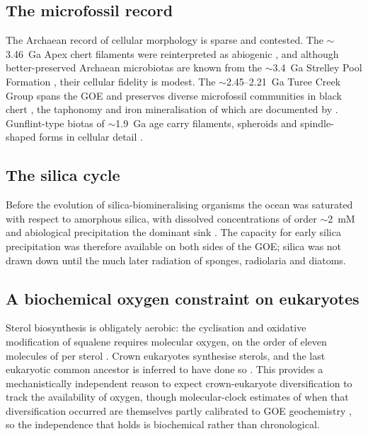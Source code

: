 \documentclass[11pt]{article}
\begin{document}
\subsection{The microfossil record}

The Archaean record of cellular morphology is sparse and contested. The $\sim$3.46~Ga Apex chert
filaments \citep{Schopf1993} were reinterpreted as abiogenic \citep{Brasier2002}, and although
better-preserved Archaean microbiotas are known from the $\sim$3.4~Ga Strelley Pool Formation
\citep{Sugitani2010,Delarue2020}, their cellular fidelity is modest. The $\sim$2.45--2.21~Ga Turee
Creek Group spans the GOE and preserves diverse microfossil communities in black chert
\citep{Barlow2018}, the taphonomy and iron mineralisation of which are documented by
\citet{Lepot2017b}. Gunflint-type biotas of $\sim$1.9~Ga age carry filaments, spheroids and
spindle-shaped forms in cellular detail \citep{Lepot2017a,Javaux2018}.

\subsection{The silica cycle}

Before the evolution of silica-biomineralising organisms the ocean was saturated with respect to
amorphous silica, with dissolved concentrations of order $\sim$2~mM and abiological precipitation
the dominant sink \citep{Siever1992,Perry2007}. The capacity for early silica precipitation was
therefore available on both sides of the GOE; silica was not drawn down until the much later
radiation of sponges, radiolaria and diatoms.

\subsection{A biochemical oxygen constraint on eukaryotes}

Sterol biosynthesis is obligately aerobic: the cyclisation and oxidative modification of squalene
requires molecular oxygen, on the order of eleven molecules of  per sterol
\citep{Gold2017,Desmond2009}. Crown eukaryotes synthesise sterols, and the last eukaryotic common
ancestor is inferred to have done so \citep{Desmond2009}. This provides a mechanistically independent
reason to expect crown-eukaryote diversification to track the availability of oxygen, though
molecular-clock estimates of when that diversification occurred are themselves partly calibrated to
GOE geochemistry \citep{Gold2017}, so the independence that holds is biochemical rather than
chronological.
\end{document}
